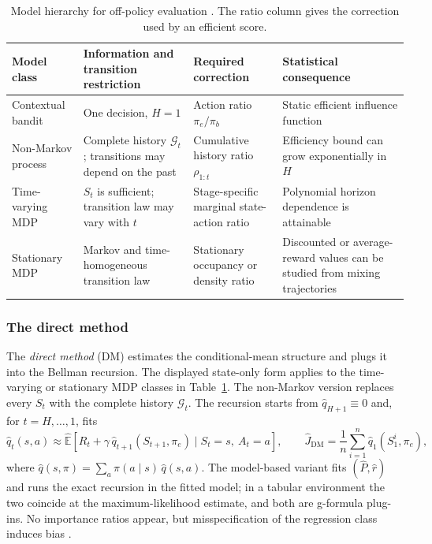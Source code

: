 \begin{table}[htbp]
\centering
\caption{Model hierarchy for off-policy evaluation \citep{ueharaShiKallus2022ope}. The ratio column gives the correction used by an efficient score.}
\label{tab:ope_model_hierarchy}
{\small
\renewcommand{\arraystretch}{1.25}
\begin{tabularx}{\textwidth}{p{} p{} p{} >{\raggedright\arraybackslash}X}
\toprule
Model class & Information and transition restriction & Required correction & Statistical consequence \\
\midrule
Contextual bandit & One decision, $H=1$ & Action ratio $\pi_e/\pi_b$ & Static efficient influence function \\
Non-Markov process & Complete history $\mathcal G_t$; transitions may depend on the past & Cumulative history ratio $\rho_{1:t}$ & Efficiency bound can grow exponentially in $H$ \\
Time-varying MDP & $S_t$ is sufficient; transition law may vary with $t$ & Stage-specific marginal state-action ratio & Polynomial horizon dependence is attainable \\
Stationary MDP & Markov and time-homogeneous transition law & Stationary occupancy or density ratio & Discounted or average-reward values can be studied from mixing trajectories \\
\bottomrule
\end{tabularx}
}
\end{table}

\subsubsection*{The direct method}

The \emph{direct method} (DM) estimates the conditional-mean structure and plugs it into the Bellman recursion. The displayed state-only form applies to the time-varying or stationary MDP classes in Table~\ref{tab:ope_model_hierarchy}. The non-Markov version replaces every $S_t$ with the complete history $\mathcal G_t$. The recursion starts from $\hat{q}_{H+1} \equiv 0$ and, for $t = H, \ldots, 1$, fits
\begin{equation}
\hat{q}_t(s, a) \approx \widehat{\mathbb{E}}\!\left[R_t + \gamma\, \hat{q}_{t+1}(S_{t+1}, \pi_e) \mid S_t = s,\ A_t = a\right],
\qquad
\hat{J}_{\mathrm{DM}} = \frac{1}{n} \sum_{i=1}^{n} \hat{q}_1(S_1^i, \pi_e),
\label{eq:ope_dm}
\end{equation}
where $\hat{q}(s, \pi) = \sum_a \pi(a \mid s)\, \hat{q}(s, a)$. The model-based variant fits $(\hat{P}, \hat{r})$ and runs the exact recursion in the fitted model; in a tabular environment the two coincide at the maximum-likelihood estimate, and both are g-formula plug-ins. No importance ratios appear, but misspecification of the regression class induces bias \citep{jiangli2016doubly, farajtabar2018mrdr}.

